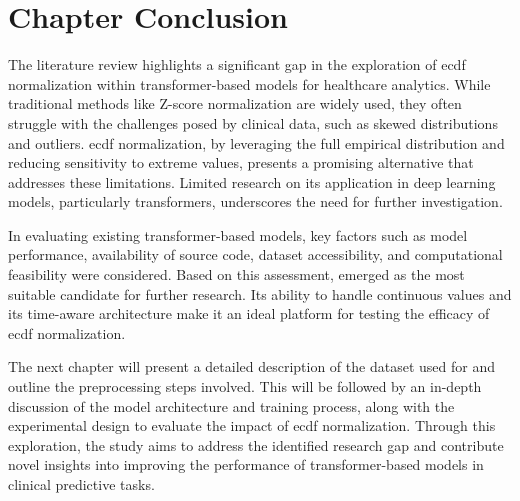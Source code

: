 \section{Chapter Conclusion}

The literature review highlights a significant gap in the exploration of \gls{ecdf} normalization within transformer-based models for healthcare analytics. While traditional methods like Z-score normalization are widely used, they often struggle with the challenges posed by clinical data, such as skewed distributions and outliers. \gls{ecdf} normalization, by leveraging the full empirical distribution and reducing sensitivity to extreme values, presents a promising alternative that addresses these limitations. Limited research on its application in deep learning models, particularly transformers, underscores the need for further investigation.

In evaluating existing transformer-based models, key factors such as model performance, availability of source code, dataset accessibility, and computational feasibility were considered. Based on this assessment,  emerged as the most suitable candidate for further research. Its ability to handle continuous values and its time-aware architecture make it an ideal platform for testing the efficacy of \gls{ecdf} normalization.

The next chapter will present a detailed description of the dataset used for  and outline the preprocessing steps involved. This will be followed by an in-depth discussion of the model architecture and training process, along with the experimental design to evaluate the impact of \gls{ecdf} normalization. Through this exploration, the study aims to address the identified research gap and contribute novel insights into improving the performance of transformer-based models in clinical predictive tasks.


